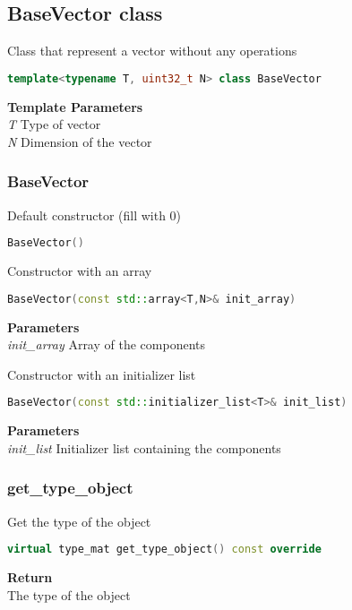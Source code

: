 \subsection{BaseVector  class}
Class that represent a vector without any operations
\begin{lstlisting}[language=C++]
template<typename T, uint32_t N> class BaseVector 
\end{lstlisting}
\textbf{Template Parameters} \\ 
\textit{T} Type of vector \\ 
\textit{N} Dimension of the vector \\ 

\subsubsection{BaseVector}
\begin{mdframed}
Default constructor (fill with 0)
\begin{lstlisting}[language=C++]
BaseVector()
\end{lstlisting}
\end{mdframed}

\begin{mdframed}
Constructor with an array
\begin{lstlisting}[language=C++]
BaseVector(const std::array<T,N>& init_array)
\end{lstlisting}
\textbf{Parameters} \\ 
\textit{init\_array} Array of the components \\ 
\end{mdframed}

\begin{mdframed}
Constructor with an initializer list
\begin{lstlisting}[language=C++]
BaseVector(const std::initializer_list<T>& init_list)
\end{lstlisting}
\textbf{Parameters} \\ 
\textit{init\_list} Initializer list containing the components \\ 
\end{mdframed}

\subsubsection{get\_type\_object}
\begin{mdframed}
Get the type of the object
\begin{lstlisting}[language=C++]
virtual type_mat get_type_object() const override 
\end{lstlisting}
\textbf{Return} \\ 
The type of the object\\ 
\end{mdframed}

